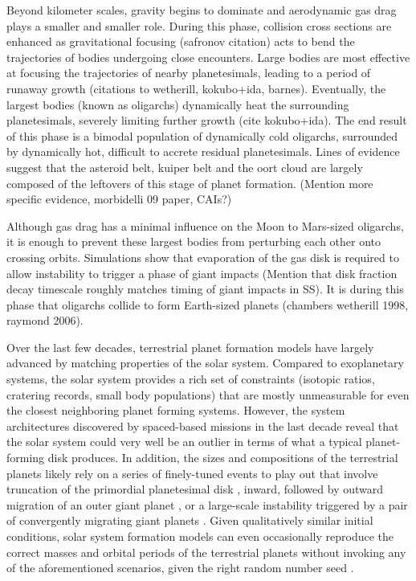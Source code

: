 \documentclass[twocolumn]{aastex63}
\begin{document}
Beyond kilometer scales, gravity begins to dominate and aerodynamic gas drag plays a smaller and smaller role. During this phase, collision cross sections are enhanced as gravitational focusing (safronov citation) acts to bend the trajectories of bodies undergoing close encounters. Large bodies are most effective at focusing the trajectories of nearby planetesimals, leading to a period of runaway growth (citations to wetherill, kokubo+ida, barnes). Eventually, the largest bodies (known as oligarchs) dynamically heat the surrounding planetesimals, severely limiting further growth (cite kokubo+ida). The end result of this phase is a bimodal population of dynamically cold oligarchs, surrounded by dynamically hot, difficult to accrete residual planetesimals. Lines of evidence suggest that the asteroid belt, kuiper belt and the oort cloud are largely composed of the leftovers of this stage of planet formation. (Mention more specific evidence, morbidelli 09 paper, CAIs?)

Although gas drag has a minimal influence on the Moon to Mars-sized oligarchs, it is enough to prevent these largest bodies from perturbing each other onto crossing orbits. Simulations show that evaporation of the gas disk is required to allow instability to trigger a phase of giant impacts (Mention that disk fraction decay timescale roughly matches timing of giant impacts in SS). It is during this phase that oligarchs collide to form Earth-sized planets (chambers wetherill 1998, raymond 2006).

Over the last few decades, terrestrial planet formation models have largely advanced by matching properties of the solar system. Compared to exoplanetary systems, the solar system provides a rich set of constraints (isotopic ratios, cratering records, small body populations) that are mostly unmeasurable for even the closest neighboring planet forming systems. However, the system architectures discovered by spaced-based missions in the last decade reveal that the solar system could very well be an outlier in terms of what a typical planet-forming disk produces. In addition, the sizes and compositions of the terrestrial planets likely rely on a series of finely-tuned events to play out that involve truncation of the primordial planetesimal disk \citep{raymond17}, inward, followed by outward migration of an outer giant planet \citep{walsh11}, or a large-scale instability triggered by a pair of convergently migrating giant planets \citep{tsiganis05, levison11, nesvorny11}. Given qualitatively similar initial conditions, solar system formation models can even occasionally reproduce the correct masses and orbital periods of the terrestrial planets without invoking any of the aforementioned scenarios, given the right random number seed \citep{fischer14}.
\end{document}
